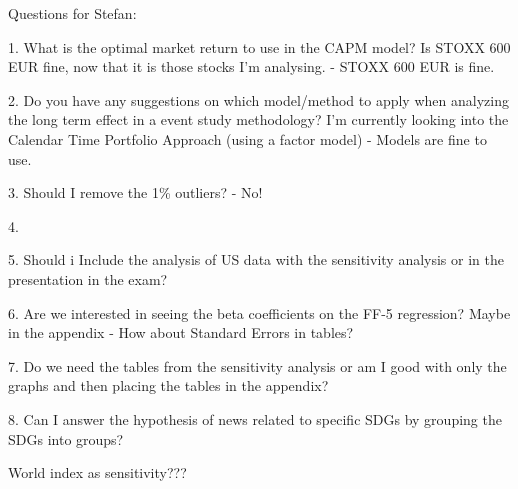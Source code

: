 Questions for Stefan:

1. What is the optimal market return to use in the CAPM model? Is STOXX 600 EUR fine, now that it is those stocks I'm analysing. 
- STOXX 600 EUR is fine. 

2. Do you have any suggestions on which model/method to apply when analyzing the long term effect in a event study methodology? I'm currently looking into the Calendar Time Portfolio Approach (using a factor model) - Models are fine to use. 

3. Should I remove the 1\% outliers?
- No!

4.

5.  Should i Include the analysis of US data with the sensitivity analysis or in the presentation in the exam?

6. Are we interested in seeing the beta coefficients on the FF-5 regression? Maybe in the appendix
- How about Standard Errors in tables? 

7. Do we need the tables from the sensitivity analysis or am I good with only the graphs and then placing the tables in the appendix?

8. Can I answer the hypothesis of news related to specific SDGs by grouping the SDGs into groups?


World index as sensitivity???